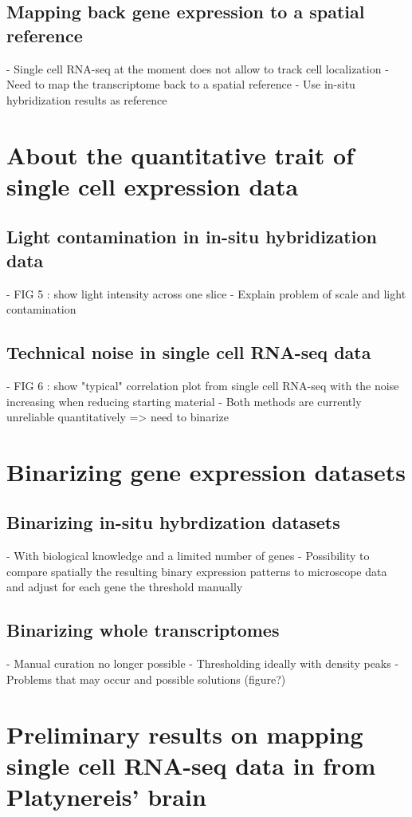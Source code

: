   \subsection*{Mapping back gene expression to a spatial reference}
    - Single cell RNA-seq at the moment does not allow to track cell localization
    - Need to map the transcriptome back to a spatial reference
    - Use in-situ hybridization results as reference


\section{About the quantitative trait of single cell expression data}
  \subsection*{Light contamination in in-situ hybridization data}
    - FIG 5 : show light intensity across one slice
    - Explain problem of scale and light contamination

  \subsection*{Technical noise in single cell RNA-seq data}
    - FIG 6 : show "typical" correlation plot from single cell RNA-seq with the noise increasing when reducing starting material
    - Both methods are currently unreliable quantitatively => need to binarize

\section{Binarizing gene expression datasets}
  \subsection*{Binarizing in-situ hybrdization datasets}
    - With biological knowledge and a limited number of genes
    - Possibility to compare spatially the resulting binary expression patterns to microscope data and adjust for each gene the threshold manually
  \subsection*{Binarizing whole transcriptomes}
    - Manual curation no longer possible
    - Thresholding ideally with density peaks
    - Problems that may occur and possible solutions (figure?)

\section{Preliminary results on mapping single cell RNA-seq data in from Platynereis' brain}
